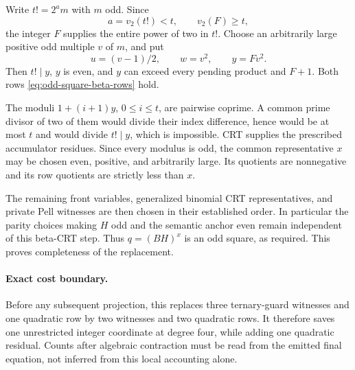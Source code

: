 Write $t!=2^a m$ with $m$ odd.  Since
\[
 a=v_2(t!)<t,\qquad v_2(F)\ge t,
\]
the integer $F$ supplies the entire power of two in $t!$.  Choose an
arbitrarily large positive odd multiple $v$ of $m$, and put
\[
 u=(v-1)/2,\qquad w=v^2,\qquad y=Fv^2.
\]
Then $t!\mid y$, $y$ is even, and $y$ can exceed every pending product
and $F+1$.  Both rows \eqref{eq:odd-square-beta-rows} hold.

The moduli $1+(i+1)y$, $0\le i\le t$, are pairwise coprime.  A common
prime divisor of two of them would divide their index difference, hence
would be at most $t$ and would divide $t!\mid y$, which is impossible.
CRT supplies the prescribed accumulator residues.  Since every modulus
is odd, the common representative $x$ may be chosen even, positive, and
arbitrarily large.  Its quotients are nonnegative and its row quotients
are strictly less than $x$.

The remaining front variables, generalized binomial CRT representatives,
and private Pell witnesses are then chosen in their established order.
In particular the parity choices making $H$ odd and the semantic anchor
even remain independent of this beta-CRT step.  Thus $q=(BH)^x$ is an
odd square, as required.  This proves completeness of the replacement.

\paragraph{Exact cost boundary.}
Before any subsequent projection, this replaces three ternary-guard
witnesses and one quadratic row by two witnesses and two quadratic rows.
It therefore saves one unrestricted integer coordinate at degree four,
while adding one quadratic residual.  Counts after algebraic contraction
must be read from the emitted final equation, not inferred from this
local accounting alone.
